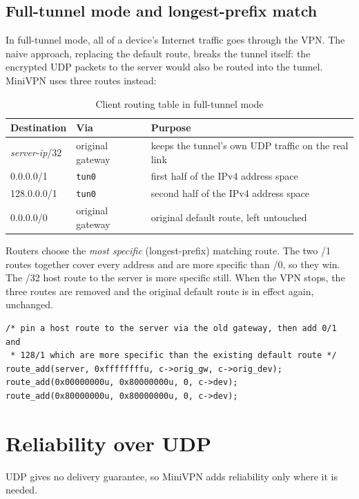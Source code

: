 \documentclass[12pt,a4paper]{report}
\begin{document}
\subsection{Full-tunnel mode and longest-prefix match}
In full-tunnel mode, all of a device's Internet traffic goes through the VPN. The naive
approach, replacing the default route, breaks the tunnel itself: the encrypted UDP
packets to the server would also be routed into the tunnel. MiniVPN uses three routes
instead:

\begin{table}[H]
\centering
\caption{Client routing table in full-tunnel mode}
\begin{tabular}{@{}lll@{}}
\toprule
\textbf{Destination} & \textbf{Via} & \textbf{Purpose}\\
\midrule
\textit{server-ip}/32 & original gateway & keeps the tunnel's own UDP traffic on the real link\\
0.0.0.0/1 & \texttt{tun0} & first half of the IPv4 address space\\
128.0.0.0/1 & \texttt{tun0} & second half of the IPv4 address space\\
0.0.0.0/0 & original gateway & original default route, left untouched\\
\bottomrule
\end{tabular}
\end{table}
Routers choose the \emph{most specific} (longest-prefix) matching route. The two /1
routes together cover every address and are more specific than /0, so they win. The
/32 host route to the server is more specific still. When the VPN stops, the three
routes are removed and the original default route is in effect again, unchanged.

\begin{lstlisting}[caption={Full-tunnel routes (\texttt{src/client.c})}]
/* pin a host route to the server via the old gateway, then add 0/1 and
 * 128/1 which are more specific than the existing default route */
route_add(server, 0xffffffffu, c->orig_gw, c->orig_dev);
route_add(0x00000000u, 0x80000000u, 0, c->dev);
route_add(0x80000000u, 0x80000000u, 0, c->dev);
\end{lstlisting}

\section{Reliability over UDP}
UDP gives no delivery guarantee, so MiniVPN adds reliability only where it is needed.
\end{document}
